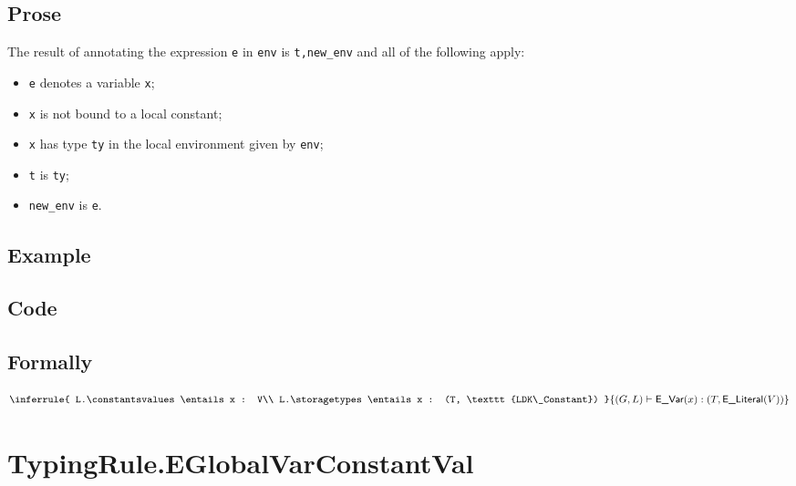 \documentclass{book}
\newcommand\eliteral[1]{\textsf{E\_Literal}(#1)}
\begin{document}
  \subsection{Prose}
  The result of annotating the expression \texttt{e} in \texttt{env} is
\texttt{t,new\_env} and all of the following apply:
  \begin{itemize}
  \item \texttt{e} denotes a variable \texttt{x};
  \item \texttt{x} is not bound to a local constant;
  \item \texttt{x} has type \texttt{ty} in the local environment given by \texttt{env};
  \item \texttt{t} is \texttt{ty};
  \item \texttt{new\_env} is \texttt{e}.
  \end{itemize}

  \subsection{Example}

  \subsection{Code}

\begin{emptyformal}
  \subsection{Formally}
\[
\inferrule{
  L.\constantsvalues \entails x : V\\
  L.\storagetypes \entails x : (T, \texttt{LDK\_Constant})
  }
{(G,L) \entails \evar(x) : (T, \eliteral{V})}
\]
\end{emptyformal}


\section{TypingRule.EGlobalVarConstantVal \label{sec:TypingRule.EGlobalVarConstant}}
\end{document}
